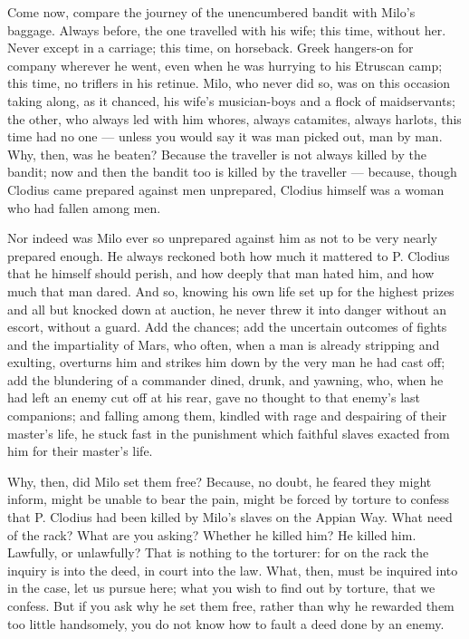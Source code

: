  Come now, compare the journey of the unencumbered bandit with Milo's baggage. Always before, the one travelled with his wife; this time, without her. Never except in a carriage; this time, on horseback. Greek hangers-on for company wherever he went, even when he was hurrying to his Etruscan camp; this time, no triflers in his retinue. Milo, who never did so, was on this occasion taking along, as it chanced, his wife's musician-boys and a flock of maidservants; the other, who always led with him whores, always catamites, always harlots, this time had no one --- unless you would say it was man picked out, man by man. Why, then, was he beaten? Because the traveller is not always killed by the bandit; now and then the bandit too is killed by the traveller --- because, though Clodius came prepared against men unprepared, Clodius himself was a woman who had fallen among men.

 Nor indeed was Milo ever so unprepared against him as not to be very nearly prepared enough. He always reckoned both how much it mattered to P. Clodius that he himself should perish, and how deeply that man hated him, and how much that man dared. And so, knowing his own life set up for the highest prizes and all but knocked down at auction, he never threw it into danger without an escort, without a guard. Add the chances; add the uncertain outcomes of fights and the impartiality of Mars, who often, when a man is already stripping and exulting, overturns him and strikes him down by the very man he had cast off; add the blundering of a commander dined, drunk, and yawning, who, when he had left an enemy cut off at his rear, gave no thought to that enemy's last companions; and falling among them, kindled with rage and despairing of their master's life, he stuck fast in the punishment which faithful slaves exacted from him for their master's life.

 Why, then, did Milo set them free? Because, no doubt, he feared they might inform, might be unable to bear the pain, might be forced by torture to confess that P. Clodius had been killed by Milo's slaves on the Appian Way. What need of the rack? What are you asking? Whether he killed him? He killed him. Lawfully, or unlawfully? That is nothing to the torturer: for on the rack the inquiry is into the deed, in court into the law. What, then, must be inquired into in the case, let us pursue here; what you wish to find out by torture, that we confess. But if you ask why he set them free, rather than why he rewarded them too little handsomely, you do not know how to fault a deed done by an enemy.

